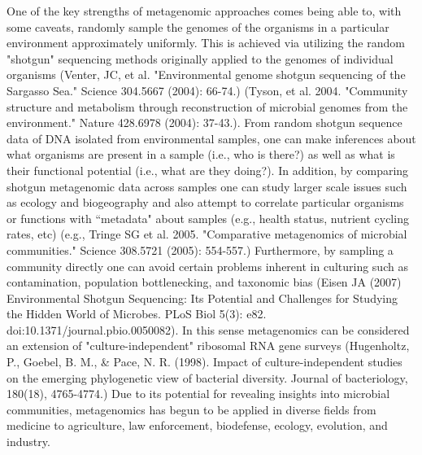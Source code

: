 \documentclass[10pt]{article}
\begin{document}
One of the key strengths of metagenomic approaches comes being able to, with some caveats, randomly sample the genomes of the organisms in a particular environment approximately uniformly.  This is achieved via utilizing the random "shotgun" sequencing methods originally applied to the genomes of individual organisms (Venter, JC, et al. "Environmental genome shotgun sequencing of the Sargasso Sea." Science 304.5667 (2004): 66-74.) (Tyson, et al. 2004. "Community structure and metabolism through reconstruction of microbial genomes from the environment." Nature 428.6978 (2004): 37-43.).
From random shotgun sequence data of DNA isolated from environmental samples, one can make inferences about what organisms are present in a sample (i.e., who is there?) as well as what is their functional potential (i.e., what are they doing?).
In addition, by comparing shotgun metagenomic data across samples one can study larger scale issues such as ecology and biogeography and also attempt to correlate particular organisms or functions with ``metadata" about samples (e.g., health status, nutrient cycling rates, etc) (e.g., Tringe SG et al. 2005. "Comparative metagenomics of microbial communities." Science 308.5721 (2005): 554-557.)
Furthermore, by sampling a community directly one can avoid certain problems inherent in culturing such as contamination, population bottlenecking, and taxonomic bias (Eisen JA (2007) Environmental Shotgun Sequencing: Its Potential and Challenges for Studying the Hidden World of Microbes. PLoS Biol 5(3): e82. doi:10.1371/journal.pbio.0050082).  In this sense metagenomics can be considered an extension of "culture-independent" ribosomal RNA gene surveys (Hugenholtz, P., Goebel, B. M., & Pace, N. R. (1998). Impact of culture-independent studies on the emerging phylogenetic view of bacterial diversity. Journal of bacteriology, 180(18), 4765-4774.) 
Due to its potential for revealing insights into microbial communities, metagenomics has begun to be applied in diverse fields from medicine to agriculture, law enforcement, biodefense, ecology, evolution, and industry.
\end{document}
